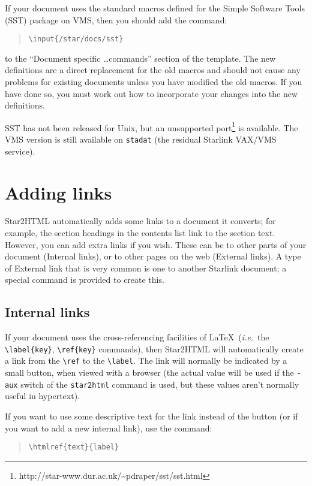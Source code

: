 \documentclass[twoside,11pt]{article}
\newcommand{\htmladdnormallinkfoot}[2]{#1\footnote{#2}}
\newcommand{\htmlref}[2]{#1}
\newcommand{\xlabel}[1]{}
\renewcommand{\_}{\texttt{\symbol{95}}}
\begin{document}
If your document uses the standard macros defined for the Simple
Software Tools (SST) package on VMS, then you should add the command:
\begin{quote}
\verb+\+\verb+input{/star/docs/sst}+
\end{quote}
to the ``Document specific \ldots commands'' section of the template.
The new definitions are a direct replacement for the old macros and should not
cause any problems for existing documents unless you have modified the old
macros.
If you have done so, you must work out how to incorporate your changes into
the new definitions.

SST has not been released for Unix, but an
\htmladdnormallinkfoot{unsupported port}
{http://star-www.dur.ac.uk/\~{}pdraper/sst/sst.html}
is available.
The VMS version is still available on \texttt{stadat} (the residual Starlink
VAX/VMS service).

\section{\xlabel{adding_links}Adding links}

Star2HTML automatically adds some links to a document it converts; for example,
the section headings in the contents list link to the section text.
However, you can add extra links if you wish.
These can be to other parts of your document (Internal links), or to
other pages on the web (External links).
A type of External link that is very common is one to another Starlink
document; a special command is provided to create this.

\subsection{\xlabel{internal_links}Internal links}

If your document uses the cross-referencing facilities of \LaTeX\
({\em{i.e.}}\ the \verb+\label{key}+, \verb+\ref{key}+ commands), then
Star2HTML will automatically create a link from the \verb+\ref+ to the
\verb+\label+.
The link will normally be indicated by a small button, when viewed with a
browser (the actual value will be used if the \texttt{-aux} switch of the
\texttt{star2html} command is used, but these values aren't normally useful
in hypertext).

If you want to use some descriptive text for the link instead of the button
(or if you want to add a new internal link), use the command:

\begin{quote}
\begin{verbatim}
\htmlref{text}{label}
\end{verbatim}
\end{quote}
\end{document}
